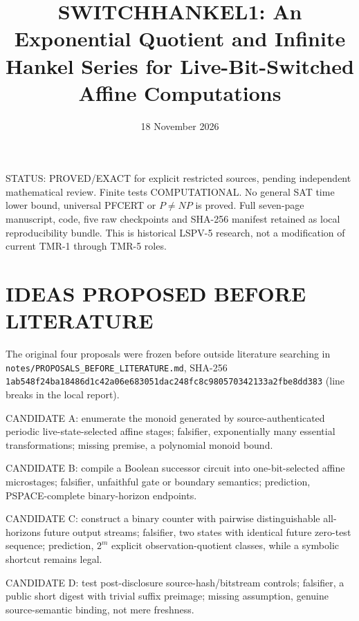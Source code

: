 \documentclass[11pt]{article}
\title{SWITCHHANKEL1: An Exponential Quotient and Infinite Hankel Series for Live-Bit-Switched Affine Computations}
\date{18 November 2026}
\begin{document}
\maketitle
\noindent STATUS: PROVED/EXACT for explicit restricted sources, pending independent mathematical review. Finite tests COMPUTATIONAL. No general SAT time lower bound, universal PFCERT or $P\ne NP$ is proved. Full seven-page manuscript, code, five raw checkpoints and SHA-256 manifest retained as local reproducibility bundle. This is historical LSPV-5 research, not a modification of current TMR-1 through TMR-5 roles.

\section{IDEAS PROPOSED BEFORE LITERATURE}
The original four proposals were frozen before outside literature searching in \texttt{notes/PROPOSALS\_BEFORE\_LITERATURE.md}, SHA-256 \texttt{1ab548f24ba18486d1c42a06e683051dac248fc8c980570342133a2fbe8dd383} (line breaks in the local report). 
\par\noindent CANDIDATE A: enumerate the monoid generated by source-authenticated periodic live-state-selected affine stages; falsifier, exponentially many essential transformations; missing premise, a polynomial monoid bound.
\par\noindent CANDIDATE B: compile a Boolean successor circuit into one-bit-selected affine microstages; falsifier, unfaithful gate or boundary semantics; prediction, PSPACE-complete binary-horizon endpoints.
\par\noindent CANDIDATE C: construct a binary counter with pairwise distinguishable all-horizons future output streams; falsifier, two states with identical future zero-test sequence; prediction, $2^m$ explicit observation-quotient classes, while a symbolic shortcut remains legal.
\par\noindent CANDIDATE D: test post-disclosure source-hash/bitstream controls; falsifier, a public short digest with trivial suffix preimage; missing assumption, genuine source-semantic binding, not mere freshness.
\end{document}

